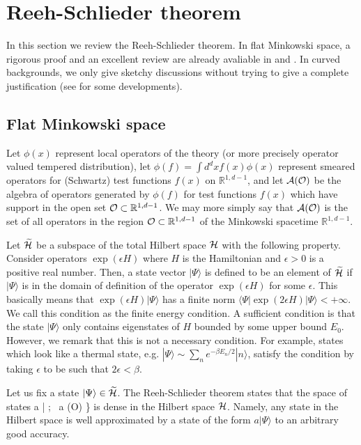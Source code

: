 \documentclass[12pt,a4paper]{article}
\theoremstyle{plain}
\theoremstyle{definition}
\numberwithin{thm}{section}
\newcommand{\bra}[1]{ \langle {#1} | }
\newcommand{\ket}[1]{ | {#1} \rangle }
\def\CA{{\cal A}}
\def\CH{{\cal H}}
\def\CO{{\cal O}}
\def\BR{{\mathbb R}}
\def\beq#1\eeq{\begin{align}#1\end{align}}
\begin{document}
\section{Reeh-Schlieder theorem }\label{sec:RS}
In this section we review the Reeh-Schlieder theorem.
In flat Minkowski space, a rigorous proof and an excellent review are already avaliable in \cite{Streater:1989vi} and \cite{Witten:2018zxz}.
In curved backgrounds, we only give sketchy discussions without trying to give a complete justification (see \cite{Strohmaier:2002mm,Gerard:2017apb,Sanders:2008gs, Morrison:2014jha} for some developments). 


\subsection{Flat Minkowski space}
Let $\phi(x)$ represent local operators of the theory (or more precisely operator valued tempered distribution),
let $\phi(f)=\int d^d x f(x) \phi(x)$ represent smeared operators for (Schwartz) test functions $f(x)$ on $\BR^{1,d-1}$,
and let $\CA(\CO)$ be the algebra of operators generated by $\phi(f)$ for test functions $f(x)$ which have support in 
the open set $\CO \subset \BR^{1,d-1}$. 
We may more simply say that $\CA(\CO)$ is the set of all operators in the region $\CO \subset \BR^{1,d-1}$ of the Minkowski spacetime $\BR^{1,d-1}$.

Let $\widetilde{\CH}$ be a subspace of the total Hilbert space $\CH$ with the following property.
Consider operators $\exp ( \epsilon H )$ where $H$ is the Hamiltonian and $\epsilon >0$ is a positive real number.
Then, a state vector $\ket{\Psi} $ is defined to be an element of $\widetilde{\CH}$ if $\ket{\Psi}$ is in the domain of definition
of the operator $\exp ( \epsilon H )$ for some $\epsilon$. This basically means that $\exp ( \epsilon H )\ket{\Psi}$ has a finite norm
$\bra{\Psi} \exp(2\epsilon H) \ket{\Psi} < + \infty$. We call this condition as the finite energy condition. 
A sufficient condition is that the state $\ket{\Psi}$ only contains eigenstates of $H$ bounded by some upper bound $E_0$.
However, we remark that this is not a necessary condition. For example, states which look like a thermal state, e.g. $\ket{\Psi} \sim \sum_n e^{-\beta E_n/2} \ket{n}$,
satisfy the condition by taking $\epsilon$ to be such that $2\epsilon < \beta$.

Let us fix a state $\ket{\Psi} \in \widetilde{\CH}$.
The Reeh-Schlieder theorem states that the space of states
\beq
\{ a \ket{\Psi}  ;~ a \in \CA(\CO) \}
\eeq
is dense in the Hilbert space $\CH$. Namely, any state in the Hilbert space is well approximated by a state of the form $a \ket{\Psi}$ to an arbitrary good accuracy. 
\end{document}
